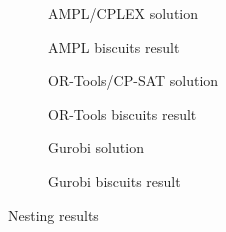 \begin{figure}[p]
	\begin{subfigure}[b]{.43\textwidth}
		\centering
		\caption{AMPL/CPLEX solution}
		\label{fig:ampl_nest_overlay}
	\end{subfigure} 
	\hfill
	\begin{subfigure}[b]{.43\textwidth}
		\centering
		\caption{AMPL biscuits result}
		\label{fig:ampl_nest_vis}
	\end{subfigure}

	\vfill
	
	\begin{subfigure}[b]{.43\textwidth}
		\centering
		\caption{OR-Tools/CP-SAT solution}
		\label{fig:ortools_nest_overlay}
	\end{subfigure} 
	\hfill
	\begin{subfigure}[b]{.43\textwidth}
		\centering
		\caption{OR-Tools biscuits result}
		\label{fig:ortools_nest_vis}
	\end{subfigure}

	\vfill
	
	\begin{subfigure}[b]{.43\textwidth}
		\centering
		\caption{Gurobi solution}
		\label{fig:gurobi_nest_overlay}
	\end{subfigure} 
	\hfill
	\begin{subfigure}[b]{.43\textwidth}
		\centering
		\caption{Gurobi biscuits result}
		\label{fig:gurobi_nest_vis}
	\end{subfigure}
	\caption{Nesting results}
	\label{fig:nesting_results}
\end{figure}
